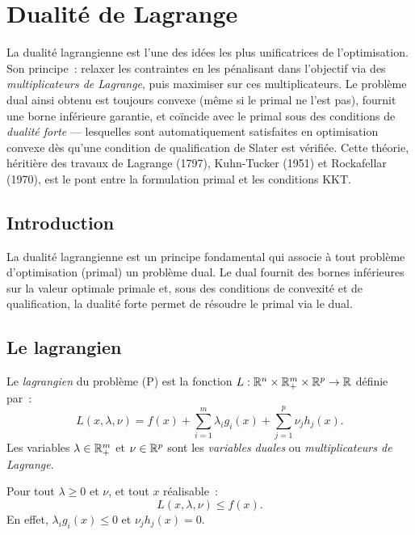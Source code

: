 \chapter{Dualit\'e de Lagrange}
\label{ch:lagrange}

La dualit\'e lagrangienne est l'une des id\'ees les plus unificatrices de l'optimisation. Son principe~: relaxer les contraintes en les p\'enalisant dans l'objectif via des \emph{multiplicateurs de Lagrange}, puis maximiser sur ces multiplicateurs. Le probl\`eme dual ainsi obtenu est toujours convexe (m\^eme si le primal ne l'est pas), fournit une borne inf\'erieure garantie, et co\"incide avec le primal sous des conditions de \emph{dualit\'e forte} --- lesquelles sont automatiquement satisfaites en optimisation convexe d\`es qu'une condition de qualification de Slater est v\'erifi\'ee. Cette th\'eorie, h\'eriti\`ere des travaux de Lagrange (1797), Kuhn-Tucker (1951) et Rockafellar (1970), est le pont entre la formulation primal et les conditions KKT.

\section{Introduction}

La dualit\'e lagrangienne est un principe fondamental qui associe \`a tout probl\`eme
d'optimisation (primal) un probl\`eme dual. Le dual fournit des bornes inf\'erieures
sur la valeur optimale primale et, sous des conditions de convexit\'e et de qualification,
la dualit\'e forte permet de r\'esoudre le primal via le dual.

\section{Le lagrangien}

\begin{definition}[Lagrangien]
Le \emph{lagrangien} du probl\`eme (P) est la fonction
$L : \mathbb{R}^n \times \mathbb{R}^m_+ \times \mathbb{R}^p \to \mathbb{R}$ d\'efinie par~:
\[
    L(x, \lambda, \nu) = f(x) + \sum_{i=1}^m \lambda_i g_i(x) + \sum_{j=1}^p \nu_j h_j(x).
\]
Les variables $\lambda \in \mathbb{R}^m_+$ et $\nu \in \mathbb{R}^p$ sont les
\emph{variables duales} ou \emph{multiplicateurs de Lagrange}.
\end{definition}

\begin{proposition}
Pour tout $\lambda \geq 0$ et $\nu$, et tout $x$ r\'ealisable~:
\[
    L(x, \lambda, \nu) \leq f(x).
\]
En effet, $\lambda_i g_i(x) \leq 0$ et $\nu_j h_j(x) = 0$.
\end{proposition}

